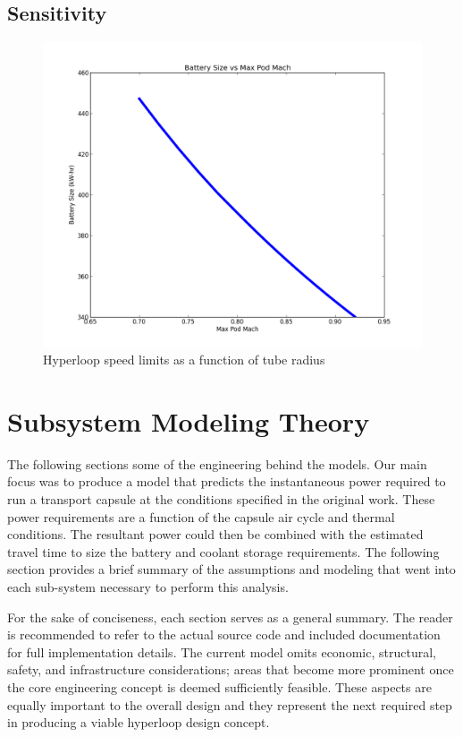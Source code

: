 \documentclass[heading.tex]{subfiles}
\begin{document}
\subsection{Sensitivity}
\begin{figure}[hbtp]
\centering
\includegraphics[scale=0.5]{images/mach_vs_energy.png}
\caption{Hyperloop speed limits as a function of tube radius}
\end{figure}

\section{Subsystem Modeling Theory}

The following sections some of the engineering behind the models. Our main focus was to produce a model that predicts the instantaneous
power required to run a transport capsule at the conditions specified in the original work. These power requirements are a function of the
capsule air cycle and thermal conditions. The resultant power could then be combined with the estimated travel time to size the battery
and coolant storage requirements. The following section provides a brief summary of the assumptions and modeling that went into each
sub-system necessary to perform this analysis.

For the sake of conciseness, each section serves as a general summary. The reader is recommended to refer to the actual source code and
included documentation for full implementation details. The current model omits economic, structural, safety, and infrastructure
considerations; areas that become more prominent once the core engineering concept is deemed sufficiently feasible. These aspects are
equally important to the overall design and they represent the next required step in producing a viable hyperloop design concept.
\end{document}

